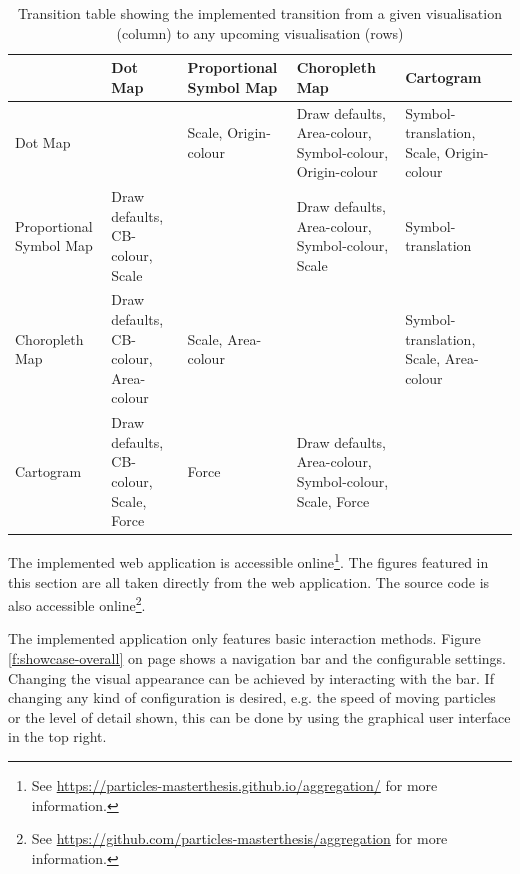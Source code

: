 \begin{table}[!htp]
    \begin{tabular}{M{27mm}|| M{27mm} | M{27mm} | M{27mm} | M{27mm} N}

    ~ & Dot Map & Proportional Symbol Map & Choropleth Map & Cartogram &\\[4ex] \hline \hline

    Dot Map & ~ & Scale, Origin-colour & Draw defaults, Area-colour, Symbol-colour, Origin-colour & Symbol-translation, Scale, Origin-colour &\\[4ex] \hline

    Proportional Symbol Map & Draw defaults, CB-colour, Scale & ~ & Draw defaults, Area-colour, Symbol-colour, Scale & Symbol-translation &\\[4ex] \hline

    Choropleth Map & Draw defaults, CB-colour, Area-colour & Scale, Area-colour & ~ & Symbol-translation, Scale, Area-colour &\\[4ex] \hline

    Cartogram & Draw defaults, CB-colour, Scale, Force & Force & Draw defaults, Area-colour, Symbol-colour, Scale, Force & ~ &\\[4ex]

    \end{tabular}
    \caption{Transition table showing the implemented transition from a given visualisation (column) to any upcoming visualisation (rows)}
    \label{tab:transition-table-implemented}
\end{table}

The implemented web application is accessible online\footnote{See \href{https://particles-masterthesis.github.io/aggregation/}{https://particles-masterthesis.github.io/aggregation/} for more information.}. The figures featured in this section are all taken directly from the web application. The source code is also accessible online\footnote{See \href{https://github.com/particles-masterthesis/aggregation}{https://github.com/particles-masterthesis/aggregation} for more information.}.

The implemented application only features basic interaction methods. Figure \ref{f:showcase-overall} on page \pageref{f:showcase-overall} shows a navigation bar and the configurable settings. Changing the visual appearance can be achieved by interacting with the bar. If changing any kind of configuration is desired, e.g. the speed of moving particles or the level of detail shown, this can be done by using the graphical user interface in the top right.

